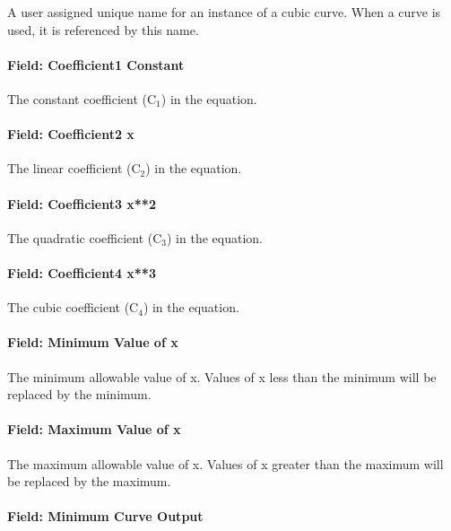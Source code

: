 A user assigned unique name for an instance of a cubic curve. When a curve is used, it is referenced by this name.

\paragraph{Field: Coefficient1 Constant}\label{field-coefficient1-constant-3}

The constant coefficient (C\(_{1}\)) in the equation.

\paragraph{Field: Coefficient2 x}\label{field-coefficient2-x-2}

The linear coefficient (C\(_{2}\)) in the equation.

\paragraph{Field: Coefficient3 x**2}\label{field-coefficient3-x2-1}

The quadratic coefficient (C\(_{3}\)) in the equation.

\paragraph{Field: Coefficient4 x**3}\label{field-coefficient4-x3}

The cubic coefficient (C\(_{4}\)) in the equation.

\paragraph{Field: Minimum Value of x}\label{field-minimum-value-of-x-3}

The minimum allowable value of x. Values of x less than the minimum will be replaced by the minimum.

\paragraph{Field: Maximum Value of x}\label{field-maximum-value-of-x-3}

The maximum allowable value of x. Values of x greater than the maximum will be replaced by the maximum.

\paragraph{Field: Minimum Curve Output}\label{field-minimum-curve-output-2}

